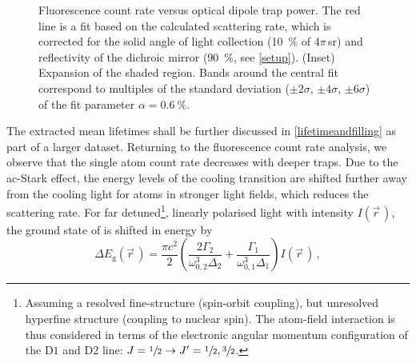 \documentclass[../Thesis-IJspeert.tex]{subfiles}
\begin{document}
\begin{figure}[h]
	\caption[An example of a floating figure]{Fluorescence count rate versus optical dipole trap power. The red line is a fit based on the calculated scattering rate, which is corrected for the solid angle of light collection (\SI{10}{\percent} of $4\pi\,$sr) and reflectivity of the dichroic mirror (\SI{90}{\percent}, see \autoref{setup}). (Inset) Expansion of the shaded region. Bands around the central fit correspond to multiples of the standard deviation ($\pm2\sigma$, $\pm4\sigma$, $\pm6\sigma$) of the fit parameter $\alpha=\SI{0.6}{\percent}$.} %
	\label{starkfig} 
\end{figure}
The extracted mean lifetimes shall be further discussed in \autoref{lifetimeandfilling} as part of a larger dataset. Returning to the fluorescence count rate analysis, we observe that the single atom count rate decreases with deeper traps. Due to the ac-Stark effect, the energy levels of the cooling transition are shifted further away from the cooling light for atoms in stronger light fields, which reduces the scattering rate. For far detuned\footnote{Assuming a resolved fine-structure (spin-orbit coupling), but unresolved hyperfine structure (coupling to nuclear spin). The atom-field interaction is thus considered in terms of the electronic angular momentum configuration of the $\mathrm{D}1$ and $\mathrm{D}2$ line: $J=\sfrac{1}{2} \rightarrow J' =\sfrac{1}{2},\sfrac{3}{2}$.}, linearly polarised light with intensity $I(\vec{r}\,)$, the ground state of  is shifted in energy by
\begin{equation}
\label{starkequation}
\Delta E_\text{g}(\vec{r}\,) = \frac{\pi c^2}{2}\left( \frac{2\Gamma_2}{\omega_{0,2}^3\Delta_2} + \frac{\Gamma_1}{\omega_{0,1}^3\Delta_1}\right) I(\vec{r}\,)	\,,
\end{equation}
\end{document}
